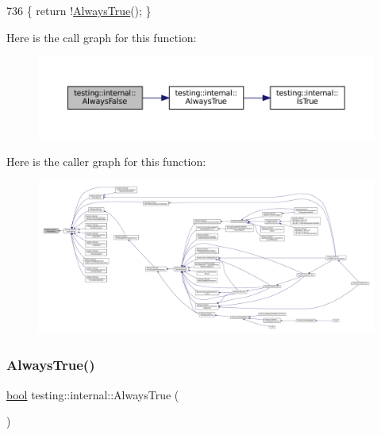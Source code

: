 \begin{DoxyCode}
736 \{ \textcolor{keywordflow}{return} !\hyperlink{namespacetesting_1_1internal_a922c9da63cd4bf94fc473b9ecac76414}{AlwaysTrue}(); \}
\end{DoxyCode}
Here is the call graph for this function\+:
\nopagebreak
\begin{figure}[H]
\begin{center}
\leavevmode
\includegraphics[width=350pt]{namespacetesting_1_1internal_a4b24c851ab13569b1b15b3d259b60d2e_cgraph}
\end{center}
\end{figure}
Here is the caller graph for this function\+:
\nopagebreak
\begin{figure}[H]
\begin{center}
\leavevmode
\includegraphics[width=350pt]{namespacetesting_1_1internal_a4b24c851ab13569b1b15b3d259b60d2e_icgraph}
\end{center}
\end{figure}
\mbox{\label{namespacetesting_1_1internal_a922c9da63cd4bf94fc473b9ecac76414}} 
\subsubsection{\texorpdfstring{Always\+True()}{AlwaysTrue()}}
{\footnotesize\ttfamily \hyperlink{classbool}{bool} testing\+::internal\+::\+Always\+True (\begin{DoxyParamCaption}{ }\end{DoxyParamCaption})}



